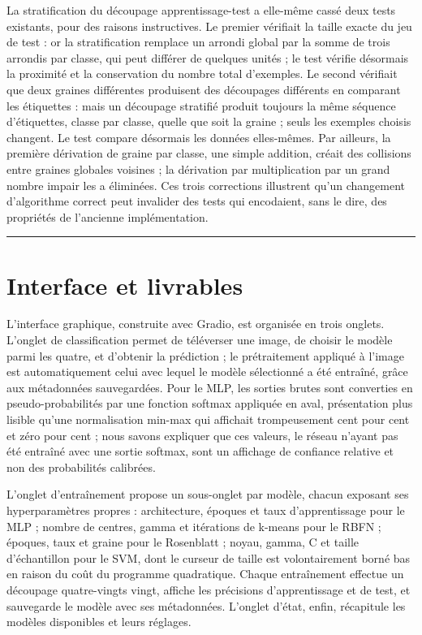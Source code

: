 \documentclass[11pt,a4paper]{report}
\begin{document}
La stratification du découpage apprentissage-test a elle-même cassé deux
tests existants, pour des raisons instructives. Le premier vérifiait la
taille exacte du jeu de test : or la stratification remplace un arrondi
global par la somme de trois arrondis par classe, qui peut différer de
quelques unités ; le test vérifie désormais la proximité et la
conservation du nombre total d'exemples. Le second vérifiait que deux
graines différentes produisent des découpages différents en comparant
les étiquettes : mais un découpage stratifié produit toujours la même
séquence d'étiquettes, classe par classe, quelle que soit la graine ;
seuls les exemples choisis changent. Le test compare désormais les
données elles-mêmes. Par ailleurs, la première dérivation de graine par
classe, une simple addition, créait des collisions entre graines
globales voisines ; la dérivation par multiplication par un grand nombre
impair les a éliminées. Ces trois corrections illustrent qu'un
changement d'algorithme correct peut invalider des tests qui encodaient,
sans le dire, des propriétés de l'ancienne implémentation.

\begin{center}\rule{0.5\linewidth}{0.5pt}\end{center}

\hypertarget{interface-et-livrables}{%
\chapter{Interface et livrables}\label{interface-et-livrables}}

L'interface graphique, construite avec Gradio, est organisée en trois
onglets. L'onglet de classification permet de téléverser une image, de
choisir le modèle parmi les quatre, et d'obtenir la prédiction ; le
prétraitement appliqué à l'image est automatiquement celui avec lequel
le modèle sélectionné a été entraîné, grâce aux métadonnées
sauvegardées. Pour le MLP, les sorties brutes sont converties en
pseudo-probabilités par une fonction softmax appliquée en aval,
présentation plus lisible qu'une normalisation min-max qui affichait
trompeusement cent pour cent et zéro pour cent ; nous savons expliquer
que ces valeurs, le réseau n'ayant pas été entraîné avec une sortie
softmax, sont un affichage de confiance relative et non des probabilités
calibrées.

L'onglet d'entraînement propose un sous-onglet par modèle, chacun
exposant ses hyperparamètres propres : architecture, époques et taux
d'apprentissage pour le MLP ; nombre de centres, gamma et itérations de
k-means pour le RBFN ; époques, taux et graine pour le Rosenblatt ;
noyau, gamma, C et taille d'échantillon pour le SVM, dont le curseur de
taille est volontairement borné bas en raison du coût du programme
quadratique. Chaque entraînement effectue un découpage quatre-vingts
vingt, affiche les précisions d'apprentissage et de test, et sauvegarde
le modèle avec ses métadonnées. L'onglet d'état, enfin, récapitule les
modèles disponibles et leurs réglages.
\end{document}

